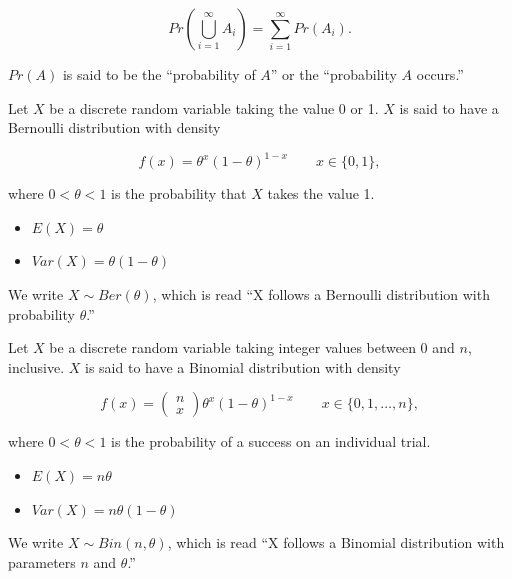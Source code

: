 \documentclass[
  letterpaper,
  DIV=11,
  numbers=noendperiod]{scrreprt}
\providecommand{\tightlist}{%
  \setlength{\itemsep}{0pt}\setlength{\parskip}{0pt}}\usepackage{longtable,booktabs,array}
\theoremstyle{plain}
\theoremstyle{definition}
\theoremstyle{definition}
\theoremstyle{remark}
\begin{document}
\[Pr\left(\bigcup_{i = 1}^{\infty} A_i\right) = \sum_{i = 1}^{\infty} Pr\left(A_i\right).\]

\(Pr(A)\) is said to be the ``probability of \(A\)'' or the
``probability \(A\) occurs.''

\begin{description}
\tightlist
\item[Bernoulli Distribution
(Definition~\ref{def-bernoulli-distribution})]
Let \(X\) be a discrete random variable taking the value 0 or 1. \(X\)
is said to have a Bernoulli distribution with density
\end{description}

\[f(x) = \theta^x (1 - \theta)^{1 - x} \qquad x \in \{0, 1\},\]

where \(0 < \theta < 1\) is the probability that \(X\) takes the value
1.

\begin{itemize}
\tightlist
\item
  \(E(X) = \theta\)
\item
  \(Var(X) = \theta(1 - \theta)\)
\end{itemize}

We write \(X \sim Ber(\theta)\), which is read ``X follows a Bernoulli
distribution with probability \(\theta\).''

\begin{description}
\tightlist
\item[Binomial Distribution
(Definition~\ref{def-binomial-distribution})]
Let \(X\) be a discrete random variable taking integer values between 0
and \(n\), inclusive. \(X\) is said to have a Binomial distribution with
density
\end{description}

\[f(x) = \begin{pmatrix}n \\ x\end{pmatrix} \theta^x (1 - \theta)^{1 - x} \qquad x \in \{0, 1, \dotsc, n\},\]

where \(0 < \theta < 1\) is the probability of a success on an
individual trial.

\begin{itemize}
\tightlist
\item
  \(E(X) = n\theta\)
\item
  \(Var(X) = n\theta(1 - \theta)\)
\end{itemize}

We write \(X \sim Bin(n, \theta)\), which is read ``X follows a Binomial
distribution with parameters \(n\) and \(\theta\).''
\end{document}
